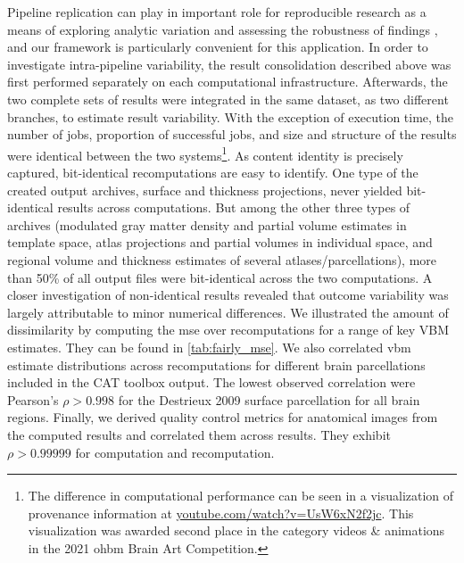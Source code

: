 Pipeline replication can play in important role for reproducible research as a means of exploring analytic variation and assessing the robustness of findings \citep{li2021moving}, and our framework is particularly convenient for this application.
In order to investigate intra-pipeline variability, the result consolidation described above was first performed separately on each computational infrastructure.
Afterwards, the two complete sets of results were integrated in the same dataset, as two different branches, to estimate result variability.
With the exception of execution time, the number of jobs, proportion of successful jobs, and size and structure of the results were identical between the two systems\footnote{The difference in computational performance can be seen in a visualization of provenance information at \url{youtube.com/watch?v=UsW6xN2f2jc}. This visualization was awarded second place in the category videos \& animations in the 2021 \gls{ohbm} Brain Art Competition.}.
As content identity is precisely captured, bit-identical recomputations are easy to identify.
One type of the created output archives, surface and thickness projections, never yielded bit-identical results across computations.
But among the other three types of archives (modulated gray matter density and partial volume estimates in template space, atlas projections and partial volumes in individual space, and regional volume and thickness estimates of several atlases/parcellations), more than 50\% of all output files were bit-identical across the two computations.
A closer investigation of non-identical results revealed that outcome variability was largely attributable to minor numerical differences.
We illustrated the amount of dissimilarity by computing the \gls{mse} over recomputations for a range of key VBM estimates.
They can be found in \cref{tab:fairly_mse}.
We also correlated \gls{vbm} estimate distributions across recomputations for different brain parcellations included in the CAT toolbox output.
The lowest observed correlation were Pearson’s $\rho > 0.998$ for the Destrieux 2009 surface parcellation \citep{destrieux2010automatic} for all brain regions.
Finally, we derived quality control metrics for anatomical images from the computed results \citep{dahnke_retrospective_2013,dahnke_quality_2015} and correlated them across results.
They exhibit $\rho > 0.99999$ for computation and recomputation.


